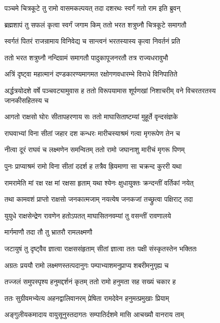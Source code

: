 \twolineshloka
{पञ्चमे चित्रकूटे तु रामो वासमकल्पयत्}
{तदा दशरथः स्वर्गं गतो राम इति ब्रुवन्}%

\twolineshloka
{ब्रह्मशापं तु सफलं कृत्वा स्वर्गं जगाम किम्}
{ततो भरत शत्रुघ्नौ चित्रकूटे समागतौ}%

\twolineshloka
{स्वर्गतं पितरं राजन्रामाय विनिवेद्य च}
{सान्त्वनं भरतस्यास्य कृत्वा निवर्तनं प्रति}%

\twolineshloka
{ततो भरत शत्रुघ्नौ नन्दिग्रामं समागतौ}
{पादुकापूजनरतौ तत्र राज्यधरावुभौ}%

\twolineshloka
{अत्रिं दृष्ट्वा महात्मानं दण्डकारण्यमागमत}
{रक्षोगणवधारम्भे विराधे विनिपातिते}%

\threelineshloka
{अर्द्धत्रयोदशे वर्षे पञ्चवट्यामुवास ह}
{ततो विरूपयामास शूर्पणखां निशाचरीम्}
{वने विचरतरतस्य जानकीसहितस्य च}%

\twolineshloka
{आगतो राक्षसो घोरः सीतापहरणाय सः}
{ततो माघासिताष्टम्यां मुहूर्ते वृन्दसंज्ञके}%

\twolineshloka
{राघवाभ्यां विना सीतां जहार दश कन्धरः}
{मारीचस्याश्रमं गत्वा मृगरूपेण तेन च}%

\twolineshloka
{नीत्वा दूरं राघवं च लक्ष्मणेन समन्वितम्}
{ततो रामो जघानाशु मारीचं मृगरू पिणम्}%

\twolineshloka
{पुनः प्राप्याश्रमं रामो विना सीतां ददर्श ह}
{तत्रैव ह्रियमाणा सा चक्रन्द कुररी यथा}%

\twolineshloka
{रामरामेति मां रक्ष रक्ष मां रक्षसा हृताम्}
{यथा श्येनः क्षुधायु्क्तः क्रन्दन्तीं वर्तिकां नयेत्}%

\twolineshloka
{तथा कामवशं प्राप्तो राक्षसो जनकात्मजाम्}
{नयत्येष जनकजां तच्छ्रुत्वा पक्षिराट् तदा}%

\twolineshloka
{युयुधे राक्षसेन्द्रेण रावणेन हतोऽपतत्}
{माघासितनवम्यां तु वसन्तीं रावणालये}%

\onelineshloka
{मार्गमाणौ तदा तौ तु भ्रातरौ रामलक्ष्मणौ}%

\twolineshloka
{जटायुषं तु दृष्ट्वैव ज्ञात्वा राक्षससंहृताम्}
{सीतां ज्ञात्वा ततः पक्षी संस्कृतस्तेन भक्तितः}%

\twolineshloka
{अग्रतः प्रययौ रामो लक्ष्मणस्तत्पदानुगः}
{पम्पाभ्याशमनुप्राप्य शबरीमनुगृह्य च}%

\twolineshloka
{तज्जलं समुपस्पृश्य हनुमद्दर्शनं कृतम्}
{ततो रामो हनुमता सह सख्यं चकार ह}%

\twolineshloka
{ततः सुग्रीवमभ्येत्य अहनद्वालिवानरम्}
{प्रेषिता रामदेवेन हनुमत्प्रमुखाः प्रियाम्}%

\twolineshloka
{अङ्गुलीयकमादाय वायुसूनुस्तदागतः}
{सम्पातिर्दशमे मासि आचख्यौ वानराय ताम्}%

